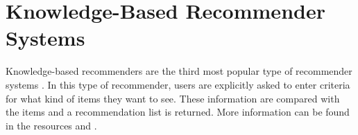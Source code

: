 
\section{Knowledge-Based Recommender Systems}\label{chapter:knowledge_based}

Knowledge-based recommenders are the third most popular type of recommender systems \cite{burke2000knowledge}. In this type of recommender, users are explicitly asked to enter criteria for what kind of items they want to see. These information are compared with the items and a recommendation list is returned. More information can be found in the resources \cite{burke2000knowledge} and \cite{felfernig2015constraint}.


